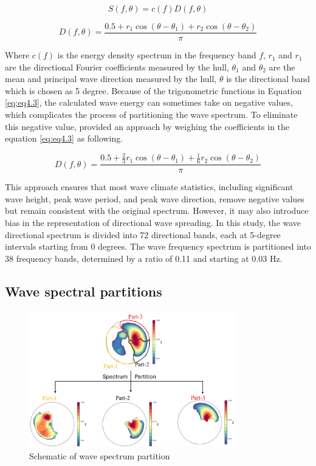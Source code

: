 \begin{equation}
    S(f,\theta) = c(f)D(f,\theta)
\label{eq:eq4.2}
\end{equation}

\begin{equation}
    D(f,\theta)=\frac{0.5+r_1\cos(\theta-\theta_1)+r_2\cos(\theta-\theta_2)}{\pi}
\label{eq:eq4.3}
\end{equation}

Where $c(f)$ is the energy density spectrum in the frequency band $f$, $r_1$ and
$r_1$ are the directional Fourier coefficients measured by the hull, $\theta_1$
and $\theta_2$  are the mean and principal wave direction measured by the hull,
$\theta$ is the directional band which is chosen as 5 degree. Because of the
trigonometric functions in Equation \ref{eq:eq4.3}, the calculated wave energy
can sometimes take on negative values, which complicates the process of
partitioning the wave spectrum. To eliminate this negative value,
\citet{earle_use_1999} provided an approach by weighing the coefficients in the
equation \ref{eq:eq4.3} as following.

\begin{equation}
    D(f,\theta)=\frac{0.5+\frac{2}{3}r_1\cos(\theta-\theta_1)+\frac{1}{6}r_2\cos(\theta-\theta_2)}{\pi}
\label{eq:eq4.4}
\end{equation}

This approach ensures that most wave climate statistics, including significant
wave height, peak wave period, and peak wave direction, remove negative values
but remain consistent with the original spectrum. However, it may also introduce
bias in the representation of directional wave spreading. In this study, the
wave directional spectrum is divided into 72 directional bands, each at 5-degree
intervals starting from 0 degrees. The wave frequency spectrum is partitioned
into 38 frequency bands, determined by a ratio of 0.11 and starting at 0.03 Hz.

\subsection{Wave spectral partitions}
\label{Wave spectral partitions}

\begin{figure}[htbp]
  \centering
  \includegraphics[width=0.8\textwidth]{chapter4/resources/figure4-3.jpg}
  \caption{Schematic of wave spectrum partition}
  \label{fig:fig4.3}
\end{figure}

